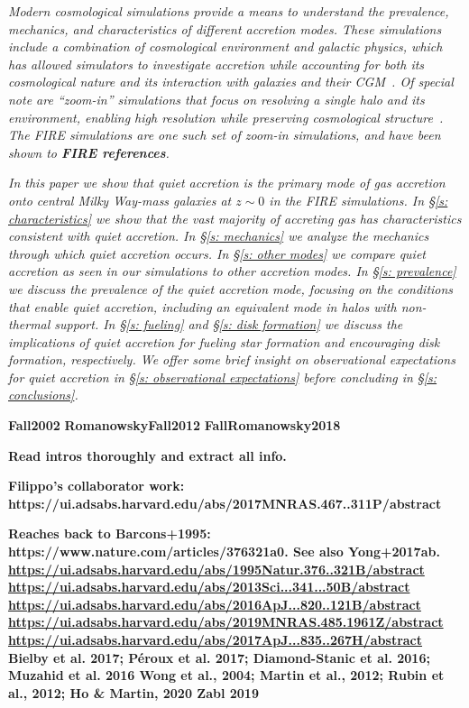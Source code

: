 \documentclass[fleqn,usenatbib]{mnras}
\begin{document}
\textit{
Modern cosmological simulations provide a means to understand the prevalence, mechanics, and characteristics of different accretion modes.
These simulations include a combination of cosmological environment and galactic physics, which has allowed simulators to investigate accretion while accounting for both its cosmological nature and its interaction with galaxies and their CGM~\citep[e.g.][Trapp et al,. in prep.]{Oppenheimer2010, Stewart2011, Fernandez2012, Ford2014, Angles-Alcazar2017, Hafen2019, Hafen2020, Ho2019, Rottgers2020}.
Of special note are ``zoom-in'' simulations that focus on resolving a single halo and its environment, enabling high resolution while preserving cosmological structure~\citep[e.g.][]{Katz1993, Hopkins2014, Hopkins2018, Wang2015, Agertz2020}.
The FIRE simulations are one such set of zoom-in simulations, and have been shown to \textbf{FIRE references}.
}

\textit{
In this paper we show that quiet accretion is the primary mode of gas accretion onto central Milky Way-mass galaxies at $z \sim 0$ in the FIRE simulations.
In \S\ref{s: characteristics} we show that the vast majority of accreting gas has characteristics consistent with quiet accretion.
In \S\ref{s: mechanics} we analyze the mechanics through which quiet accretion occurs.
In \S\ref{s: other modes} we compare quiet accretion as seen in our simulations to other accretion modes.
In \S\ref{s: prevalence} we discuss the prevalence of the quiet accretion mode, focusing on the conditions that enable quiet accretion, including an equivalent mode in halos with non-thermal support.
In \S\ref{s: fueling} and \S\ref{s: disk formation} we discuss the implications of quiet accretion for fueling star formation and encouraging disk formation, respectively.
We offer some brief insight on observational expectations for quiet accretion in \S\ref{s: observational expectations} before concluding in \S\ref{s: conclusions}.
}

\textbf{Fall2002}
\textbf{RomanowskyFall2012}
\textbf{FallRomanowsky2018}

\textbf{Read intros thoroughly and extract all info.}

\textbf{
Filippo's collaborator work: https://ui.adsabs.harvard.edu/abs/2017MNRAS.467..311P/abstract
}

\textbf{
Reaches back to Barcons+1995: https://www.nature.com/articles/376321a0.
See also Yong+2017ab.
\url{https://ui.adsabs.harvard.edu/abs/1995Natur.376..321B/abstract}
\url{https://ui.adsabs.harvard.edu/abs/2013Sci...341...50B/abstract}
\url{https://ui.adsabs.harvard.edu/abs/2016ApJ...820..121B/abstract}
\url{https://ui.adsabs.harvard.edu/abs/2019MNRAS.485.1961Z/abstract}
\url{https://ui.adsabs.harvard.edu/abs/2017ApJ...835..267H/abstract}
Bielby et al. 2017; Péroux et al. 2017; Diamond-Stanic et al. 2016; Muzahid et al. 2016
Wong et al., 2004; Martin et al., 2012; Rubin et al., 2012; Ho \& Martin, 2020
Zabl 2019
}
\end{document}

